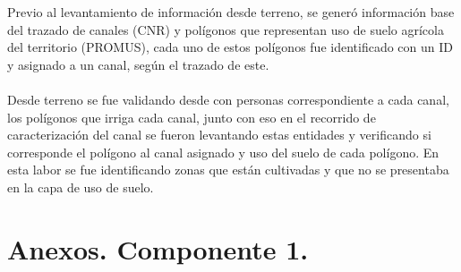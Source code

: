 \documentclass[]{article}
\begin{document}
Previo al levantamiento de información desde terreno, se generó información base del trazado de canales (CNR) y polígonos que representan uso de suelo agrícola del territorio (PROMUS), cada uno de estos polígonos fue identificado  con un ID y asignado a un canal, según el trazado de este.\\
\\
Desde terreno se fue validando desde con personas correspondiente a cada canal, los polígonos que irriga cada canal, junto con eso en el recorrido de caracterización del canal se fueron levantando estas entidades y verificando si corresponde el polígono al canal asignado y uso del suelo de cada polígono. En esta labor se fue identificando zonas que están cultivadas y que no se presentaba en la capa de uso de suelo.

\section{Anexos. Componente 1.}
\end{document}
